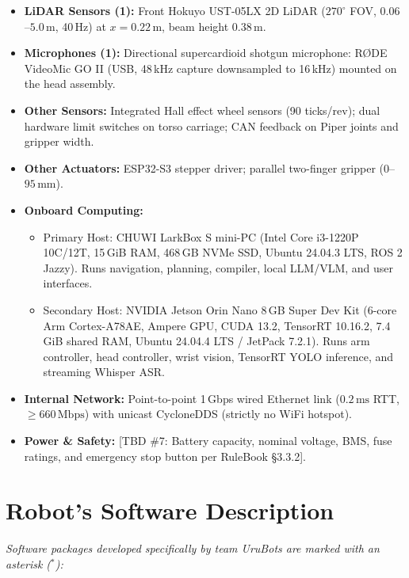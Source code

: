 \begin{itemize}
\begin{enumerate*}[label=(\roman*)]
		\end{enumerate*}
	\item \textbf{LiDAR Sensors (1):} Front Hokuyo UST-05LX 2D LiDAR ($270^\circ$ FOV, $0.06$--$5.0\,\text{m}$, 40\,Hz) at $x = 0.22\,\text{m}$, beam height $0.38\,\text{m}$.
	\item \textbf{Microphones (1):} Directional supercardioid shotgun microphone: R\O{}DE VideoMic GO II (USB, 48\,kHz capture downsampled to 16\,kHz) mounted on the head assembly.
	\item \textbf{Other Sensors:} Integrated Hall effect wheel sensors (90 ticks/rev); dual hardware limit switches on torso carriage; CAN feedback on Piper joints and gripper width.
	\item \textbf{Other Actuators:} ESP32-S3 stepper driver; parallel two-finger gripper ($0$--$95\,\text{mm}$).
	\item \textbf{Onboard Computing:}
		\begin{itemize}[nosep]
			\item Primary Host: CHUWI LarkBox S mini-PC (Intel Core i3-1220P 10C/12T, 15\,GiB RAM, 468\,GB NVMe SSD, Ubuntu 24.04.3 LTS, ROS 2 Jazzy). Runs navigation, planning, compiler, local LLM/VLM, and user interfaces.
			\item Secondary Host: NVIDIA Jetson Orin Nano 8\,GB Super Dev Kit (6-core Arm Cortex-A78AE, Ampere GPU, CUDA 13.2, TensorRT 10.16.2, 7.4\,GiB shared RAM, Ubuntu 24.04.4 LTS / JetPack 7.2.1). Runs arm controller, head controller, wrist vision, TensorRT YOLO inference, and streaming Whisper ASR.
		\end{itemize}
	\item \textbf{Internal Network:} Point-to-point 1\,Gbps wired Ethernet link ($0.2\,\text{ms}$ RTT, $\ge 660\,\text{Mbps}$) with unicast CycloneDDS (strictly no WiFi hotspot).
	\item \textbf{Power \& Safety:} [TBD \#7: Battery capacity, nominal voltage, BMS, fuse ratings, and emergency stop button per RuleBook \S 3.3.2].
\end{itemize}

\section*{Robot's Software Description}
\textit{Software packages developed specifically by team UruBots are marked with an asterisk ($^*$):}

